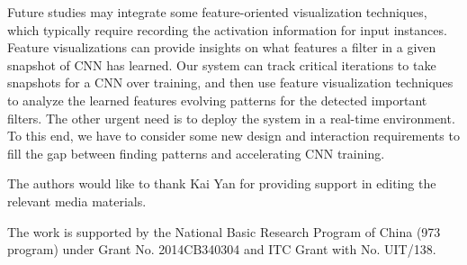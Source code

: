 \documentclass[format=acmsmall, review=false, screen=true]{acmart}
\begin{document}
Future studies may integrate some feature-oriented visualization techniques, which typically require recording the activation information for input instances. Feature visualizations can provide insights on what features a filter in a given snapshot of CNN has learned. Our system can track critical iterations to take snapshots for a CNN over training, and then use feature visualization techniques to analyze the learned features evolving patterns for the detected important filters. The other urgent need is to deploy the system in a real-time environment. To this end, we have to consider some new design and interaction requirements to fill the gap between finding patterns and accelerating CNN training.%

\begin{acks}

	The authors would like to thank Kai Yan for providing support in editing the relevant media materials.

	The work is supported by the National Basic Research Program of China (973 program) under Grant No. 2014CB340304
	and ITC Grant with No. UIT/138.


\end{acks}



\end{document}
